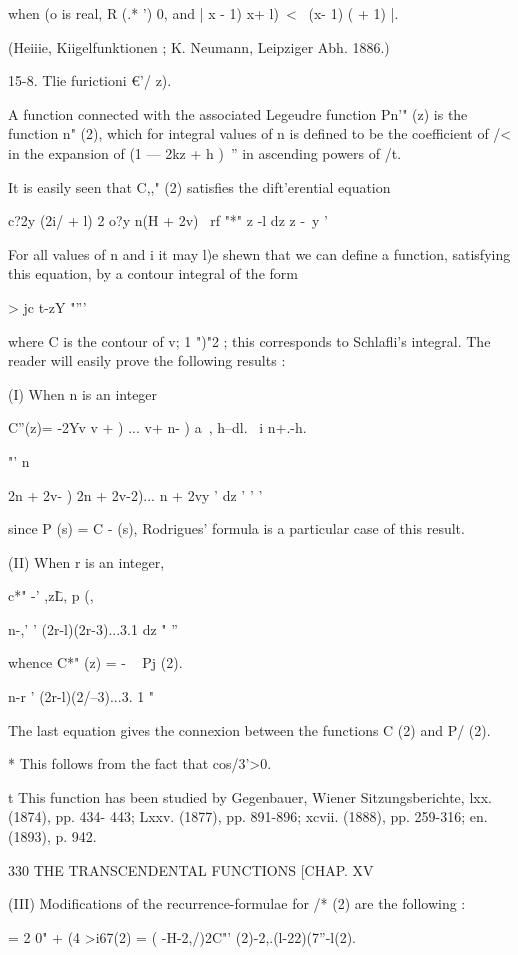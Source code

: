 {{{when (o is real, R (.* ') 0, and | x - 1) x+ l)\ < \ (x- 1) ( + 1) |.

(Heiiie, Kiigelfunktionen ; K. Neumann, Leipziger Abh. 1886.)

15-8. Tlie furictioni €'/ z).

A function connected with the associated Legeudre function Pn'" (z) is
the function n" (2), which for integral values of n is defined to be
the coefficient of /< in the expansion of (1 — 2kz + h )~'' in
ascending powers of /t.

It is easily seen that C,," (2) satisfies the dift'erential equation

c?2y (2i/ + l) 2 o?y n(H + 2v) \ rf "*" z -l dz z -\ y '

For all values of n and i it may l)e shewn that we can define a
function, satisfying this equation, by a contour integral of the form

  > jc t-zY "'''

where C is the contour of v; 1 ")"2 ; this corresponds to Schlafli's
integral. The reader will easily prove the following results :

(I) When n is an integer

C''(z)= -2Yv v + ) ... v+ n- ) a\ , h--dl. \ i n+.-h.

"' n\ \ {2n + 2v- ) 2n + 2v-2)... n + 2vy ' dz ' ' '

since P (s) = C - (s), Rodrigues' formula is a particular case of this
result.

(II) When r is an integer,

c*" -' ,z\= L, p (,\

n-,' ' (2r-l)(2r-3)...3.1 dz " ''

whence C*" (z) = - ~ Pj (2).

n-r ' (2r-l)(2/--3)...3. 1 "

The last equation gives the connexion between the functions C (2) and
P/ (2).

* This follows from the fact that cos/3'>0.

t This function has been studied by Gegenbauer, Wiener
Sitzungsberichte, lxx. (1874), pp. 434- 443; Lxxv. (1877), pp.
891-896; xcvii. (1888), pp. 259-316; en. (1893), p. 942.

330 THE TRANSCENDENTAL FUNCTIONS [CHAP. XV

(III) Modifications of the recurrence-formulae for /* (2) are the
following :

   = 2 0" + (4 >i67(2) = ( -H-2,/)2C"' (2)-2,.(l-22)(7''-l(2).

}}}}
